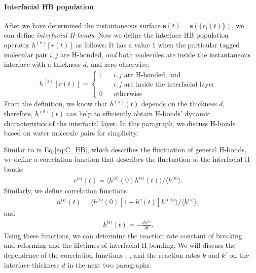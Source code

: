 \FloatBarrier
\paragraph{Interfacial HB population} \label{IHBP}
After we have determined the instantaneous surface ${\mathbf s}(t)={\mathbf s}(\{{r}_i(t)\})$, we can define \emph{interfacial H-bonds}.
Now we define the interface HB population operator $h^{(\text{s})}[{r}(t)]$ as follows:
It has a value 1 when the particular tagged molecular pair $i,j$ are H-bonded, \emph{and} both molecules are inside the instantaneous interface 
with a thickness $d$, and zero otherwise:
\begin{align}
   h^{(\text{s})}[{r}(t)]=\left\{
   \begin{array}{rcl}
           1       &      & {i,j\text{ are H-bonded, and}}\\
                &      & {i,j\text{ are inside the interfacial layer}} \\   \label{eqn:h_s}
           0       &      & {\text{otherwise}}
   \end{array} \right.
\end{align}
From the definition, we know that $h^{(\text{s})}(t)$ depends on the thickness $d$, therefore,
$h^{(\text{s})}(t)$ can help to efficiently obtain H-bonds' dynamic characteristics of 
the interfacial layer. %
In this paragraph, we discuss H-bonds based on water molecule pairs for simplicity. 

Similar to \CHB in Eq.\thinspace\ref{eq:C_HB}, which describes the fluctuation of general H-bonds,
we define a correlation function \CSHB that describes the fluctuation of the interfacial H-bonds: 
\begin{eqnarray}
c^\text{(s)}(t)=\langle h^\text{(s)}(0)h^\text{(s)}(t) \rangle/\langle h^\text{(s)}\rangle
\label{eq:C_s_HB}.
\end{eqnarray}
%
Similarly, we define correlation functions 
\begin{eqnarray}
n^\text{(s)}(t)=\langle h^\text{(s)}(0)[1-h^s(t)]h^{\text{(d,s)}} \rangle/\langle h^\text{(s)}\rangle
\label{eq:n_s_HB},
\end{eqnarray}
and 
\begin{eqnarray}
k^\text{(s)}(t)= -\frac{dc^\text{(s)}}{dt}
\label{eq:k_s_HB}.
\end{eqnarray}
Using these functions, we can determine the reaction rate constant of breaking and reforming and the lifetimes of interfacial H-bonding.
We will discuss the dependence of the correlation functions \CHB, \CSHB, and the reaction rates $k$ and $k'$ on the interface thickness $d$ in the next two paragraphs.
%
\FloatBarrier

